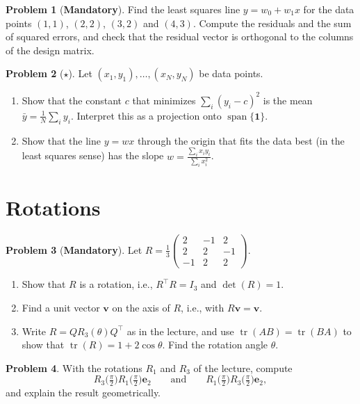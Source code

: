 \documentclass[11pt]{article}
\theoremstyle{definition}
\newtheorem{problem}{Problem}[section]
\newcommand{\mandatory}{\textcolor{red!70!black}{\textbf{Mandatory}}}
\DeclareMathOperator{\Span}{span}
\DeclareMathOperator{\tr}{tr}
\begin{document}
\begin{problem}[\mandatory]\label{pr:least-squares}
    Find the least squares line $y = w_0 + w_1 x$ for the data points $(1, 1)$, $(2, 2)$, $(3, 2)$ and $(4, 3)$. Compute the residuals and the sum of squared errors, and check that the residual vector is orthogonal to the columns of the design matrix.
\end{problem}

\begin{problem}[$\star$]\label{pr:ls-special}
    Let $(x_1, y_1), \ldots, (x_N, y_N)$ be data points.
    \begin{enumerate}[label=(\alph*)]
        \item Show that the constant $c$ that minimizes $\sum_i (y_i - c)^2$ is the mean $\bar{y} = \frac{1}{N}\sum_i y_i$. Interpret this as a projection onto $\Span\{\mathbf{1}\}$.
        \item Show that the line $y = wx$ through the origin that fits the data best (in the least squares sense) has the slope $w = \frac{\sum_i x_i y_i}{\sum_i x_i^2}$.
    \end{enumerate}
\end{problem}

\section{Rotations}

\begin{problem}[\mandatory]\label{pr:rot-axis-angle}
    Let $R = \frac{1}{3}\begin{pmatrix} 2 & -1 & 2 \\ 2 & 2 & -1 \\ -1 & 2 & 2 \end{pmatrix}$.
    \begin{enumerate}[label=(\alph*)]
        \item Show that $R$ is a rotation, i.e., $R^\top R = I_3$ and $\det(R) = 1$.
        \item Find a unit vector $\mathbf{v}$ on the axis of $R$, i.e., with $R\mathbf{v} = \mathbf{v}$.
        \item Write $R = QR_3(\theta)Q^\top$ as in the lecture, and use $\tr(AB) = \tr(BA)$ to show that $\tr(R) = 1 + 2\cos\theta$. Find the rotation angle $\theta$.
    \end{enumerate}
\end{problem}

\begin{problem}\label{pr:rot-noncomm}
    With the rotations $R_1$ and $R_3$ of the lecture, compute
    \[R_3\big(\tfrac{\pi}{2}\big) R_1\big(\tfrac{\pi}{2}\big) \mathbf{e}_2 \qquad \text{and} \qquad R_1\big(\tfrac{\pi}{2}\big) R_3\big(\tfrac{\pi}{2}\big) \mathbf{e}_2,\]
    and explain the result geometrically.
\end{problem}
\end{document}
